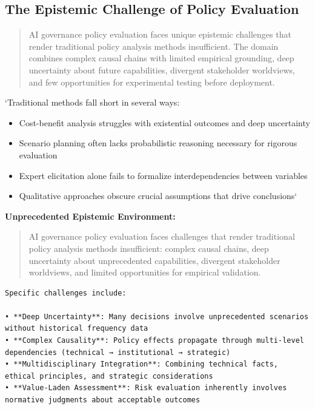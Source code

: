 \documentclass[
  11pt,
  letterpaper,
]{book}
\providecommand{\tightlist}{%
  \setlength{\itemsep}{0pt}\setlength{\parskip}{0pt}}
\begin{document}
\subsection{The Epistemic Challenge of Policy
Evaluation}\label{sec-epistemic-challenge}

\begin{quote}
AI governance policy evaluation faces unique epistemic challenges that
render traditional policy analysis methods insufficient. The domain
combines complex causal chains with limited empirical grounding, deep
uncertainty about future capabilities, divergent stakeholder worldviews,
and few opportunities for experimental testing before deployment.
\end{quote}

`Traditional methods fall short in several ways:

\begin{itemize}
\tightlist
\item
  Cost-benefit analysis struggles with existential outcomes and deep
  uncertainty
\item
  Scenario planning often lacks probabilistic reasoning necessary for
  rigorous evaluation
\item
  Expert elicitation alone fails to formalize interdependencies between
  variables
\item
  Qualitative approaches obscure crucial assumptions that drive
  conclusions`
\end{itemize}

\textbf{Unprecedented Epistemic Environment:}

\begin{quote}
AI governance policy evaluation faces challenges that render traditional
policy analysis methods insufficient: complex causal chains, deep
uncertainty about unprecedented capabilities, divergent stakeholder
worldviews, and limited opportunities for empirical validation.
\end{quote}

\begin{verbatim}
Specific challenges include:

• **Deep Uncertainty**: Many decisions involve unprecedented scenarios without historical frequency data
• **Complex Causality**: Policy effects propagate through multi-level dependencies (technical → institutional → strategic)
• **Multidisciplinary Integration**: Combining technical facts, ethical principles, and strategic considerations
• **Value-Laden Assessment**: Risk evaluation inherently involves normative judgments about acceptable outcomes
\end{verbatim}
\end{document}
